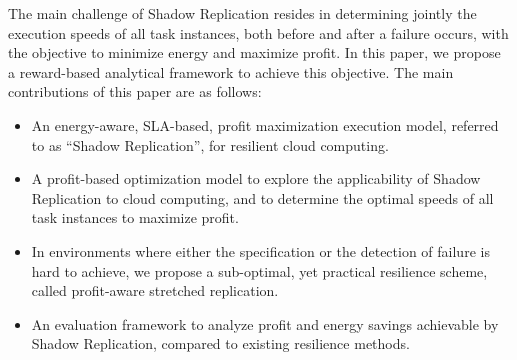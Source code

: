 The main challenge of Shadow Replication resides in determining
jointly the execution speeds of all task instances, both before and
after a failure occurs, with the objective to minimize energy and
maximize profit.  In this paper, we propose a reward-based analytical
framework to achieve this objective. The main contributions of this paper
are as follows:

\begin{itemize}

\item An energy-aware, SLA-based, profit maximization execution model, referred to as
``Shadow Replication'', for resilient cloud computing.

\item A profit-based optimization model to explore the applicability of
  Shadow Replication to cloud computing, and to determine the optimal
  speeds of all task instances to maximize profit.

\item In environments where either the specification or
the detection of failure is hard to achieve, we propose a sub-optimal,
yet practical resilience scheme, called profit-aware stretched
replication.

\item An evaluation framework to analyze profit and 
energy savings achievable by Shadow Replication, compared to existing resilience methods.

\end{itemize}



